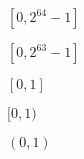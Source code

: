 \documentclass{article}
\begin{document}
$ [0, 2^{64}-1]$
\pagebreak

$ [0, 2^{63}-1]$
\pagebreak

$[0, 1] $
\pagebreak

$ [0, 1) $
\pagebreak

$ (0, 1) $
\pagebreak
\end{document}
